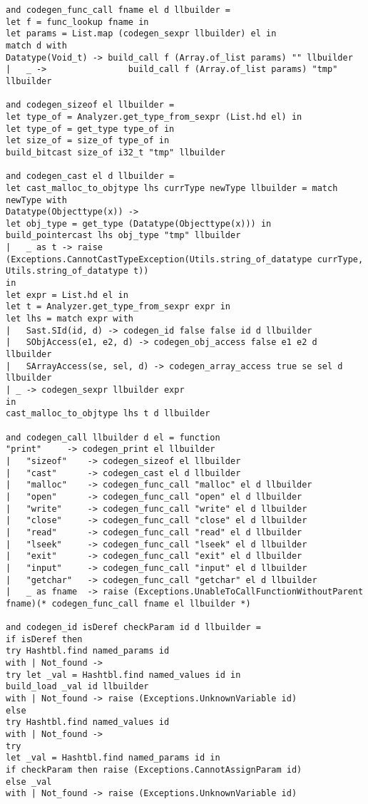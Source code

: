 \begin{verbatim}
and codegen_func_call fname el d llbuilder = 
let f = func_lookup fname in
let params = List.map (codegen_sexpr llbuilder) el in
match d with
Datatype(Void_t) -> build_call f (Array.of_list params) "" llbuilder
| 	_ -> 				build_call f (Array.of_list params) "tmp" llbuilder

and codegen_sizeof el llbuilder =
let type_of = Analyzer.get_type_from_sexpr (List.hd el) in
let type_of = get_type type_of in
let size_of = size_of type_of in
build_bitcast size_of i32_t "tmp" llbuilder

and codegen_cast el d llbuilder =
let cast_malloc_to_objtype lhs currType newType llbuilder = match newType with
Datatype(Objecttype(x)) -> 
let obj_type = get_type (Datatype(Objecttype(x))) in 
build_pointercast lhs obj_type "tmp" llbuilder
| 	_ as t -> raise (Exceptions.CannotCastTypeException(Utils.string_of_datatype currType, Utils.string_of_datatype t))
in
let expr = List.hd el in
let t = Analyzer.get_type_from_sexpr expr in
let lhs = match expr with
| 	Sast.SId(id, d) -> codegen_id false false id d llbuilder
|  	SObjAccess(e1, e2, d) -> codegen_obj_access false e1 e2 d llbuilder
| 	SArrayAccess(se, sel, d) -> codegen_array_access true se sel d llbuilder
| _ -> codegen_sexpr llbuilder expr
in
cast_malloc_to_objtype lhs t d llbuilder

and codegen_call llbuilder d el = function
"print" 	-> codegen_print el llbuilder
| 	"sizeof"	-> codegen_sizeof el llbuilder
| 	"cast" 		-> codegen_cast el d llbuilder
| 	"malloc" 	-> codegen_func_call "malloc" el d llbuilder
| 	"open" 		-> codegen_func_call "open" el d llbuilder
| 	"write"		-> codegen_func_call "write" el d llbuilder
| 	"close"		-> codegen_func_call "close" el d llbuilder
| 	"read" 		-> codegen_func_call "read" el d llbuilder
| 	"lseek" 	-> codegen_func_call "lseek" el d llbuilder
| 	"exit" 		-> codegen_func_call "exit" el d llbuilder
| 	"input" 	-> codegen_func_call "input" el d llbuilder
|   "getchar"   -> codegen_func_call "getchar" el d llbuilder
| 	_ as fname 	-> raise (Exceptions.UnableToCallFunctionWithoutParent fname)(* codegen_func_call fname el llbuilder *)

and codegen_id isDeref checkParam id d llbuilder = 
if isDeref then
try Hashtbl.find named_params id
with | Not_found ->
try let _val = Hashtbl.find named_values id in
build_load _val id llbuilder
with | Not_found -> raise (Exceptions.UnknownVariable id)
else 
try Hashtbl.find named_values id
with | Not_found ->
try 
let _val = Hashtbl.find named_params id in
if checkParam then raise (Exceptions.CannotAssignParam id)
else _val
with | Not_found -> raise (Exceptions.UnknownVariable id)


\end{verbatim}

